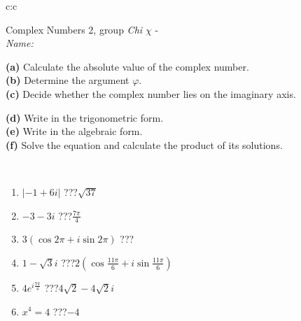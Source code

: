 \documentclass[10pt]{report}
\begin{document}
\newpage
\thispagestyle{empty}
\begin{tabular}{c:c}
\begin{minipage}[c][104.5mm][t]{0.5\linewidth}
\begin{center}
\vspace{5mm}
{\huge Complex Numbers 2, group \textit{Chi $\chi$} -}\\[5mm]
\textit{Name:}\phantom{xxxxxxxxxxxxxxxxxxxxxxxxxxxxxxxxxxxxxxxxxxxxxxxxxxxxxxxxxxxxxxxxx}\\[5mm]
\begin{minipage}{0.95\linewidth}
\begin{center}
{\small \begin{minipage}{0.44\textwidth} \raggedright
\textbf{(a)} Calculate the absolute value of the complex number. \\[1mm]
\textbf{(b)} Determine the argument \(\varphi\). \\[1mm]
\textbf{(c)} Decide whether the complex number lies on the imaginary axis. \end{minipage} \begin{minipage}{0.54\textwidth}
\textbf{(d)} Write in the trigonometric form. \\[1mm]
\textbf{(e)} Write in the algebraic form. \\[1mm]
\textbf{(f)} Solve the equation and calculate the product of its solutions.
\end{minipage}
}
\end{center}
\end{minipage}
\\[1mm]
\begin{minipage}{0.79\linewidth}
\begin{center}
\begin{varwidth}{\linewidth}
\setlength{\itemsep}{0pt}
\begin{enumerate}
\large
\item $|-1+6i|$\quad \dotfill\; ???\;\dotfill \quad $\sqrt{37}$
\item $-3-3i$\quad \dotfill\; ???\;\dotfill \quad $\frac{7\pi}{4}$
\item $3\left(\cos{2\pi}+i\sin{2\pi}\right)$\quad \dotfill\; ???\;\dotfill \quad {}
\item $1-\sqrt{3}i$\quad \dotfill\; ???\;\dotfill \quad $2\left(\cos{\frac{11\pi}{6}}+i\sin{\frac{11\pi}{6}}\right)$
\item $4e^{i\frac{7\pi}{4}}$\quad \dotfill\; ???\;\dotfill \quad $4\sqrt{2}-4\sqrt{2}i$
\item $x^4=4$\quad \dotfill\; ???\;\dotfill \quad $-4$

\end{enumerate}
\end{varwidth}
\end{center}
\end{minipage}
\end{center}
\end{minipage}
\end{tabular}
\end{document}

